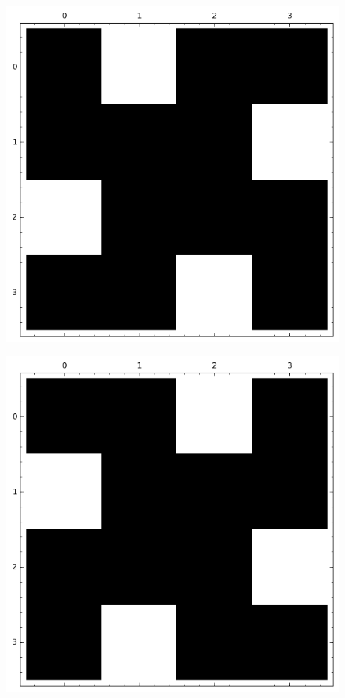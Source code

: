 \documentclass[12pt,a4paper]{article}
\begin{document}
\begin{figure}
\centering
\begin{minipage}{.48\textwidth}
  \centering
  \includegraphics[width=.9\linewidth]{../matrix_plot/sigma_1_bent_cayley_graph_index_matrix.png}
  \label{fig:sigma_1_bent_cayley_graph_index_matrix}
\end{minipage}%
\begin{minipage}{.48\textwidth}
  \centering
  \includegraphics[width=.9\linewidth]{../matrix_plot/tau_1_bent_cayley_graph_index_matrix.png}
  \label{fig:tau_1_bent_cayley_graph_index_matrix}
\end{minipage}
\end{figure}
\end{document}
